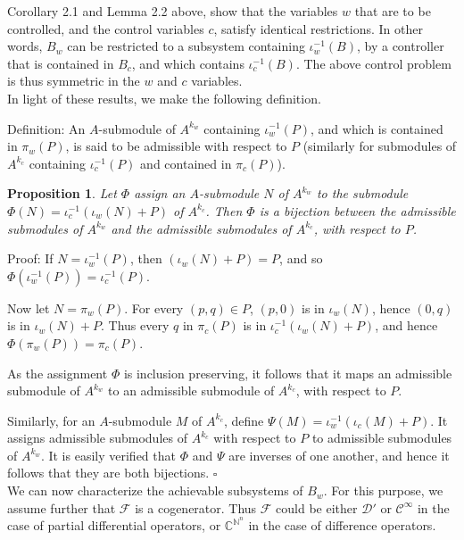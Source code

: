 \documentclass[11pt]{amsart}
\newtheorem{proposition}{Proposition}[section]
\def\Cinf{\mathcal{C}^\infty}
\def\Dr{\mathcal{D}'}
\def\C{\mathbb{C}}
\def\N{\mathbb{N}}
\newcommand{\F}{\mathcal{F}}
\begin{document}
{Corollary 2.1 and Lemma 2.2 above, show that the variables $w$ that are to be controlled, and the control variables $c$, satisfy identical restrictions. In other words, $B_w$ can be restricted to a subsystem containing $\iota_w^{-1}(B)$, by a controller that is contained in $B_c$, and which contains $\iota_c^{-1}(B)$. The above control problem is thus symmetric in the $w$ and $c$ variables. \\

In light of these results, we make the following definition.
\vspace{.25cm}

\noindent Definition: An $A$-submodule of $A^{k_w}$  containing $\iota_w^{-1}(P)$, and which is contained in $\pi_w(P)$, is said to be admissible with respect to $P$ (similarly for submodules  of $A^{k_c}$ containing $\iota_c^{-1}(P)$ and contained in $\pi_c(P)$).

\begin{proposition} Let $\Phi$ assign an $A$-submodule $N$ of $A^{k_w}$ to the submodule $\Phi(N) = \iota_c^{-1}(\iota_w(N) + P)$ of $A^{k_c}$. Then $\Phi$ is a bijection between the admissible submodules of $A^{k_w}$ and the admissible submodules of $A^{k_c}$, with respect to $P$.
\end{proposition}
\noindent Proof:  If $N = \iota_w^{-1}(P)$, then $(\iota_w(N) + P) = P$, and so $\Phi(\iota_w^{-1}(P)) = \iota_c^{-1}(P)$.  

Now let $N = \pi_w(P)$. For every $(p, q) \in P$, $(p, 0)$ is in $\iota_w(N)$, hence $(0, q)$ is in $\iota_w(N) + P$. Thus every $q$ in $\pi_c(P)$ is in $\iota_c^{-1}(\iota_w(N) + P)$, and hence $\Phi(\pi_w(P)) = \pi_c(P)$. 

As the assignment $\Phi$ is inclusion preserving, it follows that it maps an admissible submodule of $A^{k_w}$ to an admissible submodule of $A^{k_c}$, with respect to $P$.

Similarly, for an $A$-submodule $M$ of $A^{k_c}$, define $\Psi (M) = \iota_w^{-1}(\iota_c(M)+ P)$. It assigns admissible submodules of $A^{k_c}$ with respect to $P$ to admissible submodules of $A^{k_w}$. It is easily verified that $\Phi$ and $\Psi$ are inverses of one another, and hence it follows that they are both bijections.    \hspace*{\fill}$\square$\\

We can now characterize the achievable subsystems of $B_w$. For this purpose,
we assume further that $\F$ is a cogenerator. Thus $\F$ could be either $\Dr$ or $\Cinf$ in the case of partial differential operators, or $\C^{\N^n}$ in the case of difference operators.

}
\end{document}
